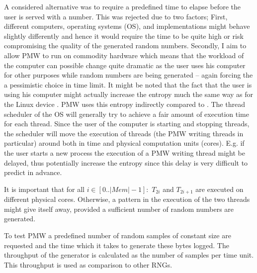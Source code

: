 A considered alternative was to require a predefined time to elapse before the user is served with a number.
This was rejected due to two factors;
First, different computers, operating systems (OS), and implementations might behave slightly differently and hence it would require the time to be quite high or risk compromising the quality of the generated random numbers.
Secondly, I aim to allow PMW to run on commodity hardware which means that the workload of the computer can possible change quite dramatic as the user uses his computer for other purposes while random numbers are being generated -- again forcing the a pessimistic choice in time limit.
It might be noted that the fact that the user is using his computer might actually increase the entropy much the same way as for the Linux device \devrandom{}.
PMW uses this entropy indirectly compared to \devrandom{}.
The thread scheduler of the OS will generally try to achieve a fair amount of execution time for each thread.
Since the user of the computer is starting and stopping threads, the scheduler will move the execution of threads (the PMW writing threads in particular) around both in time and physical computation units (cores).
E.g. if the user starts a new process the execution of a PMW writing thread might be delayed, thus potentially increase the entropy since this delay is very difficult to predict in advance.

It is important that for all $i\in\left[0..\left|Mem\right|-1\right]:$ $T_{2i}$ and $T_{2i+1}$ are executed on different physical cores.
Otherwise, a pattern in the execution of the two threads might give itself away, provided a sufficient number of random numbers are generated.

To test PMW a predefined number of random samples of constant size are requested and the time which it takes to generate these bytes logged.
The throughput of the generator is calculated as the number of samples per time unit.
This throughput is used as comparison to other RNGs.